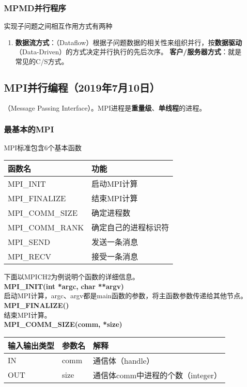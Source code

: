 \documentclass{article}
\begin{document}
				\subsubsection{MPMD并行程序}
					实现子问题之间相互作用方式有两种
					\begin{enumerate}
						\item \textbf{数据流方式}：（Dataflow）根据子问题数据的相关性来组织并行，按\textbf{数据驱动}（Data-Driven）的方式决定并行执行的先后次序。
						\textbf{客户/服务器方式}：就是常见的C/S方式。
					\end{enumerate}
			\subsection{MPI并行编程（2019年7月10日）}
				（Message Passing Interface）。MPI进程是\textbf{重量级}、\textbf{单线程}的进程。
				\subsubsection{最基本的MPI}
					MPI标准包含6个基本函数
					\begin{table}[H]
						\centering
						\begin{tabular}{ll}
							\hline
							函数名 & 功能\\
							\hline
							MPI\_INIT & 启动MPI计算\\
							MPI\_FINALIZE & 结束MPI计算\\
							MPI\_COMM\_SIZE & 确定进程数\\
							MPI\_COMM\_RANK & 确定自己的进程标识符\\
							MPI\_SEND & 发送一条消息\\
							MPI\_RECV & 接受一条消息\\
							\hline
						\end{tabular}
					\end{table}
					下面以MPICH2为例说明个函数的详细信息。
					\\\textbf{MPI\_INIT(int *argc, char **argv)}\\
						启动MPI计算，argc、argv都是main函数的参数，将主函数参数传递给其他节点。
					\\\textbf{MPI\_FINALIZE()}\\
						结束MPI计算。
					\\\textbf{MPI\_COMM\_SIZE(comm, *size)}\\
						\begin{table}[H]
							\centering
							\begin{tabular}{lll}
								\hline
								输入输出类型 & 参数名 & 解释\\
								\hline
								IN & comm & 通信体（handle）\\
								OUT & size & 通信体comm中进程的个数（integer）\\
								\hline
							\end{tabular}
						\end{table}
					
\end{document}
